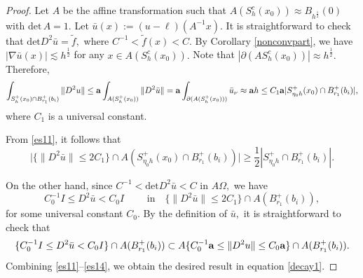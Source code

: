 \documentclass[10pt,a4paper]{amsart}
\renewcommand{\det}{\mbox{det}}
\begin{document}
	\begin{proof}
		
		Let $A$ be the affine transformation such that $A\left(S^c_h(x_0)\right)\approx B_{h^{\frac{1}{2}}}(0)$ with $\det\, A=1.$ 
		Let $\bar{u}(x):=(u-\ell)(A^{-1}x).$ It is straightforward to check that $\det D^2\bar{u}=\tilde{f},$ where $C^{-1}<\tilde{f}(x)<C.$
		By  Corollary \ref{nonconvpart},  we have $|\nabla\bar{u}(x)|\lesssim h^{\frac{1}{2}}$ for any $x\in  A(S^c_h(x_0)).$ 
		Note that $|\partial (AS^c_h(x_0))|\approx h^{\frac{1}{2}}.$
		Therefore, 
		\begin{equation}\label{es11}
			\int_{S^+_h(x_0)\cap B^{+}_{r_1}(b_i)}\|D^2u\|\leq {\bf a}\int_{A(S^+_h(x_0))}\|D^2\bar{u}\|={\bf a}\int_{\partial (A(S^+_h(x_0)))}\bar{u}_\nu\approx {\bf a} h\leq C_1{\bf a}|S^+_{\eta_0 h}(x_0)\cap B^{+}_{r_1}(b_i)|,
		\end{equation}
		where $C_1$ is a universal constant.
		
		From \eqref{es11}, it follows that 
		\begin{equation}\label{es12}
			\big|\{\|D^2\bar{u}\|\leq 2C_1\}\cap A(S^+_{\eta_0 h}(x_0)\cap B^{+}_{r_1}(b_i))\big|\geq \frac{1}{2}|S^+_{\eta_0 h}\cap B^{+}_{r_1}(b_i)|.
		\end{equation}
	
	On the other hand, since $C^{-1}<\det D^2\bar{u}<C$ in $A\Omega,$ we have 
	\begin{equation}\label{es13}
		C_0^{-1} I\leq D^2\bar{u}<C_0I\qquad \text{ in}\quad \{\|D^2\bar{u}\|\leq 2C_1\}\cap A (B^{+}_{r_1}(b_i)),
	\end{equation}
	for some universal constant $C_0.$ By the definition of $\bar{u},$ it is straightforward to check that
	\begin{equation}\label{es14}
		\{C_0^{-1}I\leq D^2\bar{u}<C_0I\}\cap A (B^{+}_{r_1}(b_i)) \subset A\{C_0^{-1}{\bf a}\leq \|D^2u\|\leq C_0{\bf a}\}\cap A (B^{+}_{r_1}(b_i)).
	\end{equation}
	Combining \eqref{es11}--\eqref{es14}, we obtain the desired result in equation \eqref{decay1}.
\end{proof}
\end{document}
